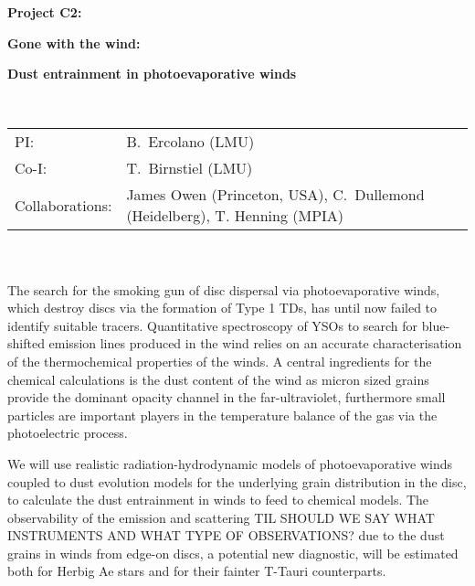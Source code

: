 \documentclass[10pt,fleqn,twoside]{article}
\newcommand{\Tcol}{\color{blue}}
\begin{document}
\newpage


\setcounter{page}{1}

\centerline{\huge\bf\Tcol
%
%
%
%
%
 Project C2:}

\centerline{\huge\bf\Tcol Gone with the wind:}
\centerline{\huge\bf\Tcol Dust entrainment in photoevaporative winds}

%
%
%
%
%
\vskip1.0cm


\\
\begin{tabular}{ll}
{\textsf{PI:}}                   & B.~Ercolano (LMU) \\
{\textsf{Co-I:}}                & T.~Birnstiel (LMU)\\
{\textsf{Collaborations:}}      &  James Owen (Princeton, USA),
                                    C.~Dullemond
                                  (Heidelberg), T. Henning (MPIA)\\

\end{tabular}


\vspace{1em}
 \\

\vspace{1em}
\\

The search for the smoking gun of disc dispersal via photoevaporative
winds, which destroy discs via the formation of Type 1 TDs,  has until
now failed to identify suitable tracers. Quantitative spectroscopy of
YSOs to search for blue-shifted emission lines produced in the wind
relies on an accurate characterisation of the thermochemical
properties of the winds. A central ingredients for the chemical
calculations is the dust content of the wind as micron sized grains
provide the dominant opacity channel in the far-ultraviolet,
furthermore small particles are important players in the temperature
balance of the gas via the photoelectric process.  

We will use realistic radiation-hydrodynamic models of
photoevaporative winds coupled to dust evolution models for the
underlying grain distribution in the disc, to calculate the dust
entrainment in winds to feed to chemical models. The observability of
the emission and scattering {\color{green} TIL SHOULD WE SAY WHAT
  INSTRUMENTS AND WHAT TYPE OF OBSERVATIONS?} due to the dust grains in winds from edge-on
discs, a potential new diagnostic, will be estimated both for Herbig
Ae stars and for their fainter T-Tauri counterparts.  
\end{document}
